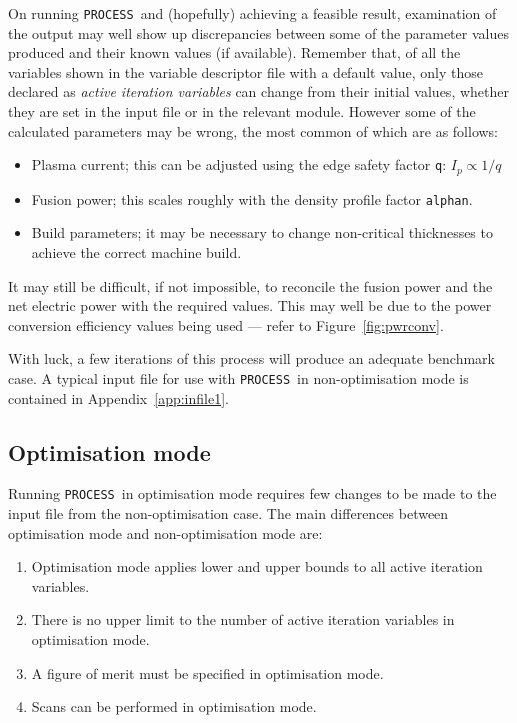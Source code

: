 \documentclass[11pt,a4paper]{report}
\newcommand{\process}{\mbox{\texttt{PROCESS}}}
\begin{document}
On running \process\ and (hopefully) achieving a feasible result, examination
of the output may well show up discrepancies between some of the parameter
values produced and their known values (if available). Remember that, of all
the variables shown in the variable descriptor file with a default value, only
those declared as \textit{active iteration variables}\/ can change from their
initial values, whether they are set in the input file or in the relevant
module. However some of the calculated parameters may be wrong, the most
common of which are as follows:
\begin{itemize}

\item Plasma current; this can be adjusted using the edge safety factor
  \texttt{q}: $I_p \propto 1/q$

\item Fusion power; this scales roughly with the density profile factor
  \texttt{alphan}.

\item Build parameters; it may be necessary to change non-critical thicknesses
  to achieve the correct machine build.

\end{itemize}

It may still be difficult, if not impossible, to reconcile the fusion power
and the net electric power with the required values. This may well be due to
the power conversion efficiency values being used --- refer to
Figure~\ref{fig:pwrconv}.

With luck, a few iterations of this process will produce an adequate benchmark
case. A typical input file for use with \process\ in non-optimisation mode is
contained in Appendix~\ref{app:infile1}.

\subsection{Optimisation mode}
\label{sec:optim}

Running \process\ in optimisation mode requires few changes to be made to the
input file from the non-optimisation case. The main differences between
optimisation mode and non-optimisation mode are:

\begin{enumerate}

\item Optimisation mode applies lower and upper bounds to all active iteration
  variables.

\item There is no upper limit to the number of active iteration variables in
  optimisation mode.

\item A figure of merit must be specified in optimisation mode.

\item Scans can be performed in optimisation mode.

\end{enumerate}
\end{document}
